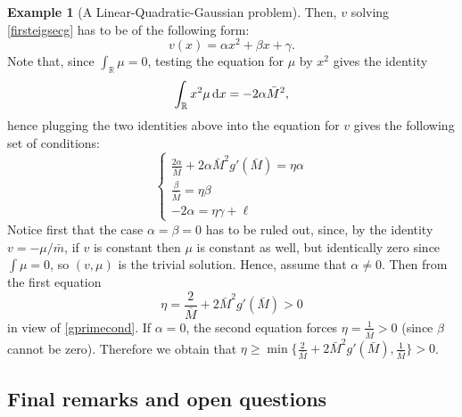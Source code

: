 \documentclass[10pt,a4paper,nouppercase,nowrite]{article}
\numberwithin{equation}{section}
\newcommand{\di}{{\rm d}}
\newcommand{\R}{\mathbb{R}}
\theoremstyle{definition}
\newtheorem{exmpl}[defn]{Example}
\begin{document}
\begin{exmpl}[A Linear-Quadratic-Gaussian problem]
Then, $v$ solving \eqref{firsteigsecg} has to be of the following form:
\[
v(x) =\alpha x^2 + \beta x + \gamma.
\]
Note that, since $\int_\R \mu = 0$, testing the equation for $\mu$ by $x^2$ gives the identity
\[
\int_{\R} x^2 \mu \, \di x = -2\alpha \bar M^2,
\]
hence plugging the two identities above into the equation for $v$ gives the following set of conditions:
\begin{equation*}
		\begin{cases}
			\frac{2\alpha}{\bar M} + 2\alpha \bar M^2 g'(\bar M) = \eta \alpha\\
			\frac{\beta}{\bar M} = \eta \beta \\
			-2\alpha = \eta \gamma +\ell
		\end{cases}
	\end{equation*}
Notice first that the case $\alpha = \beta = 0$ has to be ruled out, since, by the identity $v = -\mu/\bar m$, if $v$ is constant then $\mu$ is constant as well, but identically zero since $\int \mu = 0$, so $(v, \mu)$ is the trivial solution. Hence, assume that $\alpha \neq 0$. Then from the first equation
\[
\eta = \frac{2}{\bar M} + 2 \bar M^2 g'(\bar M) > 0
\]
in view of \eqref{gprimecond}. If $\alpha = 0$, the second equation forces $\eta = \frac{1}{\bar M} > 0$ (since $\beta$ cannot be zero). Therefore we obtain that $\eta \ge \min\{\frac{2}{\bar M} + 2 \bar M^2 g'(\bar M), \frac{1}{\bar M} \} > 0$.
\end{exmpl}

\subsection{Final remarks and open questions}
	
\end{document}
